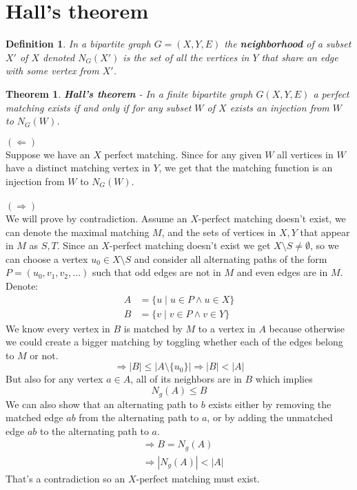 \documentclass{article}
\theoremstyle{plain}
\newtheorem{theorem}{Theorem}[section]
\newtheorem{definition}{Definition}[section]
\begin{document}
	\section{Hall's theorem}
	\begin{definition}
		In a bipartite graph $G=(X,Y,E)$ the \textbf{neighborhood} of a subset
		$X'$ of $X$ denoted $N_G(X')$ is the set of all the vertices in 
		$Y$ that share an edge with some vertex from $X'$.
	\end{definition}
	\begin{theorem}
	\textbf{Hall's theorem} - In a finite bipartite graph $G(X,Y,E)$ 
	a perfect matching exists if and only if for any subset $W$ of $X$ 
	exists an injection from $W$ to $N_G(W)$.
	\end{theorem}
	\noindent \underline{$(\Leftarrow)$} \\
	Suppose we have an $X$ perfect matching. Since for any given $W$ 
	all vertices in $W$ have a distinct matching vertex in $Y$,
	we get that the matching function is an injection from $W$ to $N_G(W)$.\\
	\\ \underline{$(\Rightarrow)$} \\
	We will prove by contradiction. Assume an $X$-perfect matching doesn't 
	exist, we can denote the maximal matching $M$, and the sets of vertices 
	in $X,Y$ that appear in $M$ as $S,T$.
	Since an $X$-perfect matching doesn't exist we get
	$X\setminus S \neq \emptyset$, 
	so we can choose a vertex $u_0 \in X \setminus S$ and consider all 
	alternating paths of the form $P=(u_0,v_1,v_2,\ldots)$ such that 
	odd edges are not in $M$ and even edges are in $M$.
	Denote:
	\begin{align*}
		A &= \{u \mid u\in P \land u\in X\} \\
		B &= \{v \mid v\in P \land v\in Y\}
	\end{align*}
	We know every vertex in $B$ is matched by $M$ to a vertex in $A$ 
	because otherwise we could create a bigger matching by toggling 
	whether each of the edges belong to $M$ or not.
	\[
		\Rightarrow |B| \le |A \setminus \{u_0\}| \Rightarrow |B| < |A|
	\]
	But also for any vertex $a\in A$, all of its neighbors are in $B$ which
	implies
	\[
		N_g(A) \le B
	\]
	We can also show that an alternating path to $b$ exists either by removing 
	the matched edge $ab$ from the alternating path to $a$, or by adding 
	the unmatched edge $ab$ to the alternating path to $a$.
	\begin{align*}
		&\Rightarrow B = N_g(A) \\ 
		&\Rightarrow |N_g(A)|<|A|
	\end{align*}
	That's a contradiction so an $X$-perfect matching must exist.
		
\end{document}
